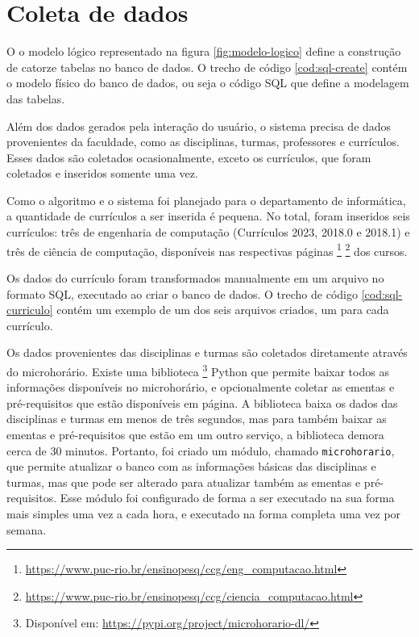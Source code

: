 \section{Coleta de dados}

O o modelo lógico representado na figura \ref{fig:modelo-logico} define a construção de catorze tabelas no banco de dados. O trecho de código \ref{cod:sql-create} contém o modelo físico do banco de dados, ou seja o código SQL que define a modelagem das tabelas.



Além dos dados gerados pela interação do usuário, o sistema precisa de dados provenientes da faculdade, como as disciplinas, turmas, professores e currículos. Esses dados são coletados ocasionalmente, exceto os currículos, que foram coletados e inseridos somente uma vez.

Como o algoritmo e o sistema foi planejado para o departamento de informática, a quantidade de currículos a ser inserida é pequena. No total, foram inseridos seis currículos: três de engenharia de computação (Currículos 2023, 2018.0 e 2018.1) e três de ciência de computação, disponíveis nas respectivas páginas
\footnote{\url{https://www.puc-rio.br/ensinopesq/ccg/eng_computacao.html}}
\footnote{\url{https://www.puc-rio.br/ensinopesq/ccg/ciencia_computacao.html}}
dos cursos.

Os dados do currículo foram transformados manualmente em um arquivo no formato SQL, executado ao criar o banco de dados. O trecho de código \ref{cod:sql-curriculo} contém um exemplo de um dos seis arquivos criados, um para cada currículo.



Os dados provenientes das disciplinas e turmas são coletados diretamente através do microhorário. Existe uma biblioteca  
\footnote{Dispon\'ivel em: \url{https://pypi.org/project/microhorario-dl/}}
Python \cite{site-python} que permite baixar todos as informações disponíveis no microhorário, e opcionalmente coletar as ementas e pré-requisitos que estão disponíveis em página. A biblioteca baixa os dados das disciplinas e turmas em menos de três segundos, mas para também baixar as ementas e pré-requisitos que estão em um outro serviço, a biblioteca demora cerca de 30 minutos. Portanto, foi criado um módulo, chamado \verb|microhorario|, que permite atualizar o banco com as informações básicas das disciplinas e turmas, mas que pode ser alterado para atualizar também as ementas e pré-requisitos. Esse módulo foi configurado de forma a ser executado na sua forma mais simples uma vez a cada hora, e executado na forma completa uma vez por semana.

